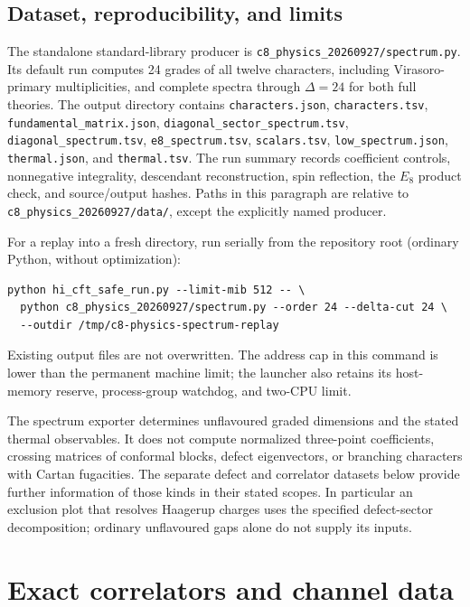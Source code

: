 \documentclass[11pt,a4paper]{article}
\theoremstyle{definition}
\newcommand{\artifact}[1]{\textnormal{\nolinkurl{#1}}}
\begin{document}
\subsection{Dataset, reproducibility, and limits}

The standalone standard-library producer is
\artifact{c8_physics_20260927/spectrum.py}.  Its default run computes
24 grades of all twelve characters, including Virasoro-primary
multiplicities, and complete spectra through $\Delta=24$ for both
full theories.  The output directory contains
\artifact{characters.json}, \artifact{characters.tsv},
\artifact{fundamental_matrix.json},
\artifact{diagonal_sector_spectrum.tsv},
\artifact{diagonal_spectrum.tsv}, \artifact{e8_spectrum.tsv},
\artifact{scalars.tsv}, \artifact{low_spectrum.json},
\artifact{thermal.json}, and \artifact{thermal.tsv}.
The run summary records coefficient controls, nonnegative integrality,
descendant reconstruction, spin reflection, the $E_8$ product check,
and source/output hashes.  Paths in this paragraph are relative to
\artifact{c8_physics_20260927/data/}, except the explicitly named
producer.

For a replay into a fresh directory, run serially from the repository
root (ordinary Python, without optimization):
\begin{verbatim}
python hi_cft_safe_run.py --limit-mib 512 -- \
  python c8_physics_20260927/spectrum.py --order 24 --delta-cut 24 \
  --outdir /tmp/c8-physics-spectrum-replay
\end{verbatim}
Existing output files are not overwritten. The address cap in this
command is lower than the permanent machine limit; the launcher also
retains its host-memory reserve, process-group watchdog, and two-CPU
limit.

The spectrum exporter determines unflavoured graded dimensions and
the stated thermal observables.  It does not compute normalized
three-point coefficients, crossing matrices of conformal blocks,
defect eigenvectors, or branching characters with Cartan fugacities.
The separate defect and correlator datasets below provide further
information of those kinds in their stated scopes.  In particular an
exclusion plot that resolves Haagerup charges uses the specified
defect-sector decomposition; ordinary unflavoured gaps alone do not
supply its inputs.

\section{Exact correlators and channel data}
\label{sec:physics-correlators}
\end{document}
